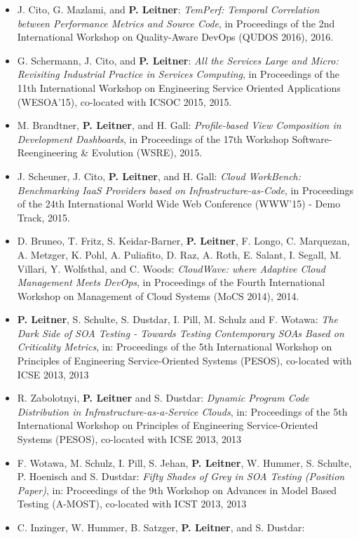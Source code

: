 \documentclass[paper=letter,fontsize=11pt]{scrartcl} %
\begin{document}
\begin{itemize}
	\item J. Cito, G. Mazlami, and \textbf{P. Leitner}: \emph{TemPerf: Temporal Correlation between Performance Metrics and Source Code}, in Proceedings of the 2nd International Workshop on Quality-Aware DevOps (QUDOS 2016), 2016.
    \item G. Schermann, J. Cito, and \textbf{P. Leitner}: \emph{All the Services Large and Micro: Revisiting Industrial Practice in Services Computing}, in Proceedings of the 11th International Workshop on Engineering Service Oriented Applications (WESOA’15), co-located with ICSOC 2015, 2015.
    \item M. Brandtner, \textbf{P. Leitner}, and H. Gall: \emph{Profile-based View Composition in Development Dashboards}, in Proceedings of the 17th Workshop Software-Reengineering \& Evolution (WSRE), 2015.
  \item J. Scheuner, J. Cito, \textbf{P. Leitner}, and H. Gall: \emph{Cloud WorkBench: Benchmarking IaaS Providers based on Infrastructure-as-Code}, in Proceedings of the 24th International World Wide Web Conference (WWW'15) - Demo Track, 2015.
 \item D. Bruneo, T. Fritz, S. Keidar-Barner, \textbf{P. Leitner}, F. Longo, C. Marquezan, A. Metzger, K. Pohl, A. Puliafito, D. Raz, A. Roth, E. Salant, I. Segall, M. Villari, Y. Wolfsthal, and C. Woods: \emph{CloudWave: where Adaptive Cloud Management Meets DevOps}, in Proceedings of the Fourth International Workshop on Management of Cloud Systems (MoCS 2014), 2014.
 \item \textbf{P. Leitner}, S. Schulte, S. Dustdar, I. Pill, M. Schulz and F. Wotawa: \emph{The Dark Side of SOA Testing - Towards Testing Contemporary SOAs Based on Criticality Metrics}, in: Proceedings of the 5th International Workshop on Principles of Engineering Service-Oriented Systems (PESOS), co-located with ICSE 2013, 2013
\item R. Zabolotnyi, \textbf{P. Leitner} and S. Dustdar: \emph{Dynamic Program Code Distribution in Infrastructure-as-a-Service Clouds}, in: Proceedings of the 5th International Workshop on Principles of Engineering Service-Oriented Systems (PESOS), co-located with ICSE 2013, 2013
\item F. Wotawa, M. Schulz, I. Pill, S. Jehan, \textbf{P. Leitner}, W. Hummer, S. Schulte, P. Hoenisch and S. Dustdar: \emph{Fifty Shades of Grey in SOA Testing (Position Paper)}, in: Proceedings of the 9th Workshop on Advances in Model Based Testing (A-MOST), co-located with ICST 2013, 2013
\item C. Inzinger, W. Hummer, B. Satzger, \textbf{P. Leitner}, and S. Dustdar:

\end{itemize}
\end{document}
